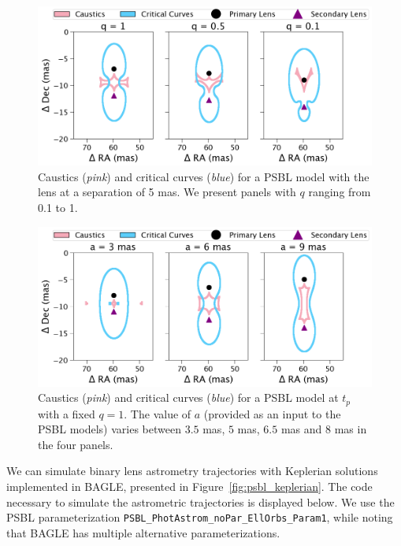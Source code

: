 \documentclass[twocolumn]{aastex701}
\begin{document}
\begin{figure}
    \centering
    \includegraphics[width= \textwidth]{figures/magmaps_varyq.png}
    \caption{Caustics (\emph{pink}) and critical curves (\emph{blue}) for a PSBL model with the lens at a separation of 5 mas. We present panels with $q$ ranging from 0.1 to 1.}
    \label{fig:magmaps_varyq}
\end{figure}



\begin{figure}
    \centering
    \includegraphics[width= \textwidth]{figures/magmaps_varysep.png}
    \caption{Caustics (\emph{pink}) and critical curves (\emph{blue}) for a PSBL model at $t_p$ with a fixed $q=1$. The value of $a$ (provided as an input to the PSBL models) varies between $3.5$ mas, $5$ mas, $6.5$ mas and $8$ mas in the four panels.}
    \label{fig:magmaps_varysep}
\end{figure}

We can simulate binary lens astrometry trajectories with Keplerian solutions implemented in BAGLE, presented in Figure~\ref{fig:psbl_keplerian}. The code necessary to simulate the astrometric trajectories is displayed below. We use the PSBL parameterization \texttt{PSBL\_PhotAstrom\_noPar\_EllOrbs\_Param1}, while noting that BAGLE has multiple alternative parameterizations. 
\end{document}
